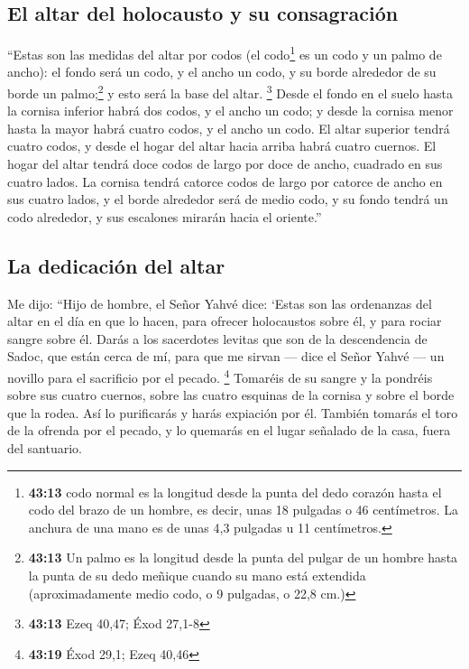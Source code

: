 \hypertarget{el-altar-del-holocausto-y-su-consagraciuxf3n}{%
\subsection{El altar del holocausto y su
consagración}\label{el-altar-del-holocausto-y-su-consagraciuxf3n}}

 ``Estas son las medidas del altar por codos (el
codo\footnote{\textbf{43:13} codo normal es la longitud desde la punta
  del dedo corazón hasta el codo del brazo de un hombre, es decir, unas
  18 pulgadas o 46 centímetros. La anchura de una mano es de unas 4,3
  pulgadas u 11 centímetros.} es un codo y un palmo de ancho): el fondo
será un codo, y el ancho un codo, y su borde alrededor de su borde un
palmo;\footnote{\textbf{43:13} Un palmo es la longitud desde la punta
  del pulgar de un hombre hasta la punta de su dedo meñique cuando su
  mano está extendida (aproximadamente medio codo, o 9 pulgadas, o 22,8
  cm.)} y esto será la base del altar. \footnote{\textbf{43:13} Ezeq
  40,47; Éxod 27,1-8}  Desde el fondo en el suelo hasta
la cornisa inferior habrá dos codos, y el ancho un codo; y desde la
cornisa menor hasta la mayor habrá cuatro codos, y el ancho un codo.
 El altar superior tendrá cuatro codos, y desde el hogar
del altar hacia arriba habrá cuatro cuernos.  El hogar
del altar tendrá doce codos de largo por doce de ancho, cuadrado en sus
cuatro lados.  La cornisa tendrá catorce codos de largo
por catorce de ancho en sus cuatro lados, y el borde alrededor será de
medio codo, y su fondo tendrá un codo alrededor, y sus escalones mirarán
hacia el oriente.''

\hypertarget{la-dedicaciuxf3n-del-altar}{%
\subsection{La dedicación del altar}\label{la-dedicaciuxf3n-del-altar}}

 Me dijo: ``Hijo de hombre, el Señor Yahvé dice: `Estas
son las ordenanzas del altar en el día en que lo hacen, para ofrecer
holocaustos sobre él, y para rociar sangre sobre él. 
Darás a los sacerdotes levitas que son de la descendencia de Sadoc, que
están cerca de mí, para que me sirvan --- dice el Señor Yahvé --- un
novillo para el sacrificio por el pecado. \footnote{\textbf{43:19} Éxod
  29,1; Ezeq 40,46}  Tomaréis de su sangre y la pondréis
sobre sus cuatro cuernos, sobre las cuatro esquinas de la cornisa y
sobre el borde que la rodea. Así lo purificarás y harás expiación por
él.  También tomarás el toro de la ofrenda por el pecado,
y lo quemarás en el lugar señalado de la casa, fuera del santuario.

